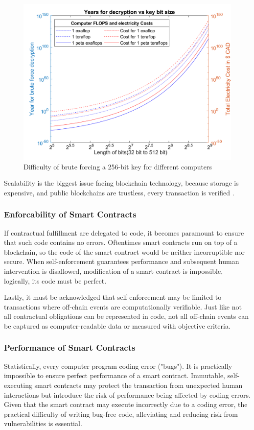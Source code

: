  	\begin{figure}[ht]
  	\centering 
  	\includegraphics[width=0.7\linewidth]{Diagrams/epicPic.png}
  	\caption{Difficulty of brute forcing a 256-bit key for different computers}
  	\label{security:fig2}
  	\end{figure}


Scalability is the biggest issue facing blockchain technology, because storage is expensive, and public blockchains are trustless, every transaction is verified \cite{EthScale:Online}. 

\subsubsection{Enforcability of Smart Contracts}



If contractual fulfillment are delegated to code, it becomes paramount to
ensure that such code contains no errors.  Oftentimes smart contracts run on top of a blockchain, so the code of the smart contract would be neither incorruptible nor secure. When self-enforcement guarantees performance and subsequent human intervention is disallowed, modification of a  smart contract is impossible, logically, its
code must be perfect. 

Lastly, it must be acknowledged that self-enforcement may be limited to transactions
where off-chain events are computationally verifiable. Just like not all contractual
obligations can be represented in code, not all off-chain events can be captured as
computer-readable data or measured with objective criteria. 

\subsubsection{Performance of Smart Contracts}
Statistically, every computer program coding error ("bugs"). It is practically impossible to ensure perfect performance of a smart contract. Immutable, self-executing smart contracts may protect  
the transaction from unexpected human interactions but introduce the risk of
performance being affected by coding errors. Given that the smart contract may execute incorrectly due to a coding error, the practical difficulty of writing bug-free code, alleviating and reducing risk from vulnerabilities is essential.


